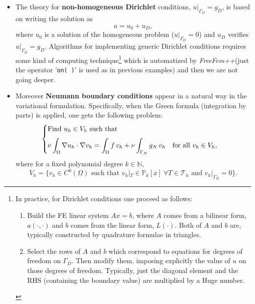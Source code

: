 \documentclass[12pt]{article}
\newcommand{\FF}{\textit{FreeFem++}\xspace}
\begin{document}
\begin{itemize}
\item The theory for \textbf{non-homogeneous Dirichlet} conditions,
  $u|_{\Gamma_D}=g_D$, is based on writing the solution as
  $$
  u = u_0 + u_D,
  $$
  where $u_0$ is a solution of the homogeneous problem
  ($u|_{\Gamma_D}=0$) and $u_D$ verifies $u|_{\Gamma_D}=g_D$.
  Algorithms for implementing generic Dirichlet conditions requires
  some kind of computing technique\footnote{In practice, for Dirichlet
    conditions one proceed as follows:
  \begin{enumerate}
  \item Build the FE linear system $Ax=b$, where $A$ comes from a
    bilinear form, $a(\cdot,\cdot)$ and $b$ comes from the linear form,
    $L(\cdot)$. Both of $A$ and $b$ are, typically constructed by
    quadrature formulae in triangles.
  \item Select the rows of $A$ and $b$ which correspond to equations
    for degrees of freedom on $\Gamma_D$. Then modify them,
    imposing explicitly the value of $u$ on those degrees of
    freedom. Typically, just the diagonal element and the RHS (containing
    the boundary value) are multiplied by a Huge number.
  \end{enumerate}
} which is automatized by \FF (just the operator '\texttt{on(\ )}' is used
as in previous examples) and then we are not going deeper.

\item Moreover \textbf{Neumann boundary conditions} appear in a natural way in the
  variational formulation. Specifically, when the Green formula
  (integration by parts) is applied, one gets the following problem:
  \begin{equation*}
      \begin{cases}
      \text{Find $u_h\in V_{h}$ such that}
      \\\noalign{\medskip}
      \begin{aligned}
        \nu\int_\Omega \nabla u_h \cdot \nabla v_h = \int_\Omega f\, v_h
        + \nu\int_{\Gamma_N} g_N\, v_h
        \quad\text{for all } v_h\in V_{h},
      \end{aligned}
    \end{cases}
  \end{equation*}
  where for a fixed polynomial degree $k\in\mathbb{N}$,
  $$V_h=\big\{v_h\in C^0(\Omega) \text{ such that }
  v_h|_T \in \mathbb{P}_k[x] \ \forall T\in \mathcal{T}_h \text{ and } v_h|_{\Gamma_D}=0\big\}.
  $$
  \end{itemize}
\end{document}
